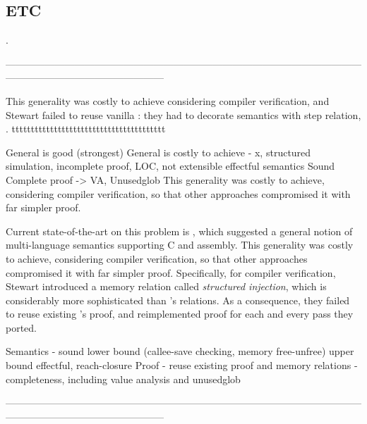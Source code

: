 {\pagebreak





\subsection{ETC}
.

------------------------------------------------------------------------------------------------------------------------------------------------------------





This generality was costly to achieve considering compiler verification, and Stewart \etal{} failed to reuse vanilla \cc{}: they had to decorate semantics with step relation, .
tttttttttttttttttttttttttttttttttttttttt




General is good (strongest)
General is costly to achieve - \cc{}x, structured simulation, incomplete proof, LOC, not extensible
effectful semantics
Sound
Complete proof -> VA, Unusedglob
This generality was costly to achieve, considering compiler verification, so that other approaches \cite{gu:dscal, wang:saccx} compromised it with far simpler proof.

Current state-of-the-art on this problem is , which suggested a general notion of multi-language semantics supporting C and assembly.
This generality was costly to achieve, considering compiler verification, so that other approaches \cite{gu:dscal, wang:saccx} compromised it with far simpler proof.
Specifically, for compiler verification, Stewart \etal{} introduced a memory relation called \textit{structured injection}, which is considerably more sophisticated than \cc{}'s relations.
As a consequence, they failed to reuse existing \cc{}'s proof, and reimplemented proof for each and every pass they ported.




Semantics - sound
            lower bound (callee-save checking, memory free-unfree)
            upper bound
            effectful, reach-closure
Proof - reuse existing proof and memory relations
      - completeness, including value analysis and unusedglob


------------------------------------------------------------------------------------------------------------------------------------------------------------











}
